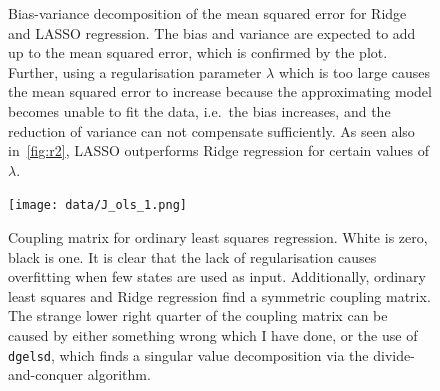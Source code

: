 \documentclass[11pt,british,a4paper]{article}
\numberwithin{equation}{section}
\begin{document}
\begin{figure}[H]
    \centering
    \caption{Bias-variance decomposition of the mean squared error for Ridge and LASSO regression. The bias and variance are expected to add up to the mean squared error, which is confirmed by the plot. Further, using a regularisation parameter \(\lambda\) which is too large causes the mean squared error to increase because the approximating model becomes unable to fit the data, i.e.\ the bias increases, and the reduction of variance can not compensate sufficiently. As seen also in~\vref{fig:r2}, LASSO outperforms Ridge regression for certain values of \(\lambda\).}
\end{figure}

\begin{figure}[H]
    \centering
    \texttt{[image: data/J\_ols\_1.png]}
    \caption{Coupling matrix for ordinary least squares regression. White is zero, black is one. It is clear that the lack of regularisation causes overfitting when few states are used as input. Additionally, ordinary least squares and Ridge regression find a symmetric coupling matrix. The strange lower right quarter of the coupling matrix can be caused by either something wrong which I have done, or the use of \lstinline{dgelsd}, which finds a singular value decomposition via the divide-and-conquer algorithm.}
\end{figure}
\end{document}
